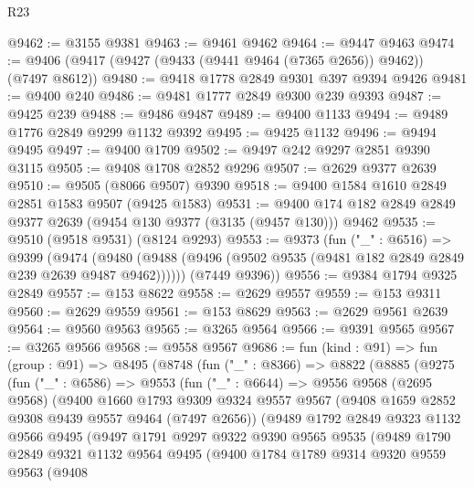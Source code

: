 \begin{lexlean}{R23}
\begin{coremodule}
@9462 := @3155 @9381
@9463 := @9461 @9462
@9464 := @9447 @9463
@9474 := @9406 (@9417 (@9427 (@9433 (@9441 @9464 (@7365 @2656)) @9462)) (@7497 @8612))
@9480 := @9418 @1778 @2849 @9301 @397 @9394 @9426
@9481 := @9400 @240
@9486 := @9481 @1777 @2849 @9300 @239 @9393
@9487 := @9425 @239
@9488 := @9486 @9487
@9489 := @9400 @1133
@9494 := @9489 @1776 @2849 @9299 @1132 @9392
@9495 := @9425 @1132
@9496 := @9494 @9495
@9497 := @9400 @1709
@9502 := @9497 @242 @9297 @2851 @9390 @3115
@9505 := @9408 @1708 @2852 @9296
@9507 := @2629 @9377 @2639
@9510 := @9505 (@8066 @9507) @9390
@9518 := @9400 @1584 @1610 @2849 @2851 @1583 @9507 (@9425 @1583)
@9531 := @9400 @174 @182 @2849 @2849 @9377 @2639 (@9454 @130 @9377 (@3135 (@9457 @130))) @9462
@9535 := @9510 (@9518 @9531) (@8124 @9293)
@9553 := @9373
    (fun ("_" : @6516) =>
    @9399
      (@9474 (@9480 (@9488 (@9496 (@9502 @9535 (@9481 @182 @2849 @2849 @239 @2639 @9487 @9462))))))
      (@7449 @9396))
@9556 := @9384 @1794 @9325 @2849
@9557 := @153 @8622
@9558 := @2629 @9557
@9559 := @153 @9311
@9560 := @2629 @9559
@9561 := @153 @8629
@9563 := @2629 @9561 @2639
@9564 := @9560 @9563
@9565 := @3265 @9564
@9566 := @9391 @9565
@9567 := @3265 @9566
@9568 := @9558 @9567
@9686 := fun (kind : @91) =>
  fun (group : @91) =>
  @8495
    (@8748
      (fun ("_" : @8366) =>
      @8822
        (@8885
          (@9275
            (fun ("_" : @6586) =>
            @9553
              (fun ("_" : @6644) =>
              @9556
                @9568
                (@2695 @9568)
                (@9400
                  @1660
                  @1793
                  @9309
                  @9324
                  @9557
                  @9567
                  (@9408 @1659 @2852 @9308 @9439 @9557 @9464 (@7497 @2656))
                  (@9489
                    @1792
                    @2849
                    @9323
                    @1132
                    @9566
                    @9495
                    (@9497
                      @1791
                      @9297
                      @9322
                      @9390
                      @9565
                      @9535
                      (@9489
                        @1790
                        @2849
                        @9321
                        @1132
                        @9564
                        @9495
                        (@9400
                          @1784
                          @1789
                          @9314
                          @9320
                          @9559
                          @9563
                          (@9408

\end{coremodule}
\end{lexlean}
